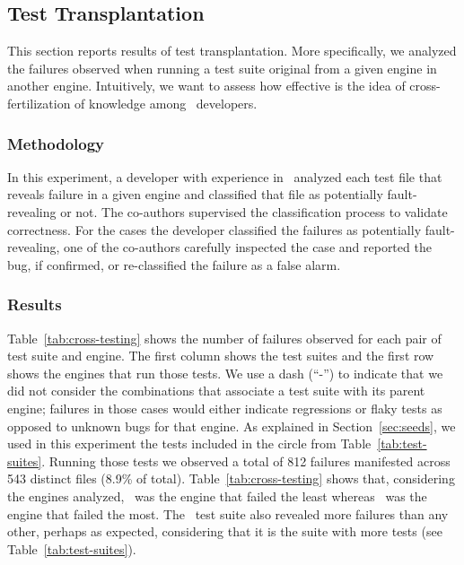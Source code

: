 \documentclass[10pt,conference,anonymous]{IEEEtran}
\begin{document}
\subsection{Test Transplantation}
\label{sec:transplantation}

This section reports results of test transplantation. More
specifically, we analyzed the failures observed when running a test
suite original from a given engine in another engine. Intuitively, we
want to assess how effective is the idea of cross-fertilization of
knowledge among \js\ developers.

\vspace{0.5ex}
\subsubsection{Methodology}
\label{sec:methodology}
In this experiment, a developer with experience in \js\ analyzed each
test file that reveals failure in a given engine and classified that
file as potentially fault-revealing or not. The co-authors supervised
the classification process to validate correctness. For the cases the
developer classified the failures as potentially fault-revealing, one
of the co-authors carefully inspected the case and reported the bug,
if confirmed, or re-classified the failure as a false alarm.

\vspace{0.5ex}
\subsubsection{Results}
\label{sec:results}

Table~\ref{tab:cross-testing} shows the number of failures observed
for each pair of test suite and engine. The first column shows the
test suites and the first row shows the engines that run those
tests. We use a dash (``-'') to indicate that we did not consider the
combinations that associate a test suite with its parent engine;
failures in those cases would either indicate regressions or flaky
tests as opposed to unknown bugs for that engine. As explained in
Section~\ref{sec:seeds}, we used in this experiment the
\totalTestFilesForTestTransplantation{} tests included in the circle
from Table~\ref{tab:test-suites}. Running those tests we observed a
total of 812 failures manifested across 543 distinct files (8.9\% of
total). Table~\ref{tab:cross-testing} shows that, considering the
engines analyzed, \smonkey\ was the engine that failed the least
whereas \chakra\ was the engine that failed the most. The
\smonkey\ test suite also revealed more failures than any other,
perhaps as expected, considering that it is the suite with more tests
(see Table~\ref{tab:test-suites}).
\end{document}
